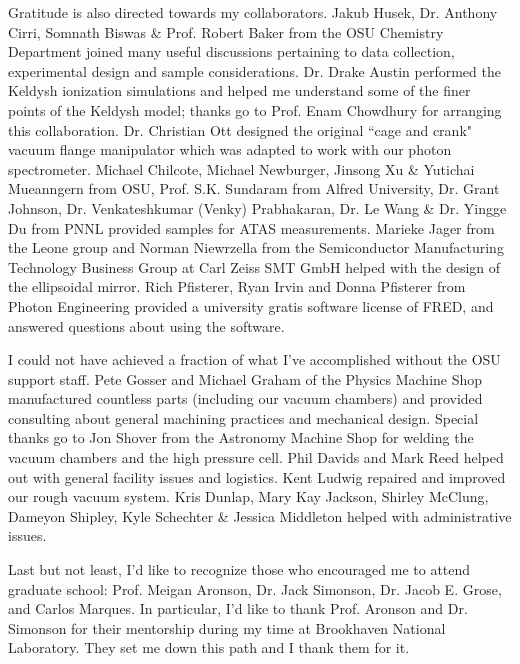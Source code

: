 \begin{acknowledgments}
Gratitude is also directed towards my collaborators. Jakub Husek, Dr. Anthony Cirri, Somnath Biswas \& Prof. Robert Baker from the OSU Chemistry Department joined many useful discussions pertaining to data collection, experimental design and sample considerations. Dr. Drake Austin performed the Keldysh ionization simulations and helped me understand some of the finer points of the Keldysh model; thanks go to Prof. Enam Chowdhury for arranging this collaboration. Dr. Christian Ott designed the original ``cage and crank" vacuum flange manipulator which was adapted to work with our photon spectrometer. Michael Chilcote, Michael Newburger, Jinsong Xu \& Yutichai Mueanngern from OSU, Prof. S.K. Sundaram from Alfred University, Dr. Grant Johnson, Dr. Venkateshkumar (Venky) Prabhakaran, Dr. Le Wang \& Dr. Yingge Du from PNNL provided samples for ATAS measurements. Marieke Jager from the Leone group and Norman Niewrzella from the Semiconductor Manufacturing Technology Business Group at Carl Zeiss SMT GmbH helped with the design of the ellipsoidal mirror. Rich Pfisterer, Ryan Irvin and Donna Pfisterer from Photon Engineering provided a university gratis software license of FRED, and answered questions about using the software.

I could not have achieved a fraction of what I've accomplished without the OSU support staff. Pete Gosser and Michael Graham of the Physics Machine Shop manufactured countless parts (including our vacuum chambers) and provided consulting about general machining practices and mechanical design. Special thanks go to Jon Shover from the Astronomy Machine Shop for welding the vacuum chambers and the high pressure cell. Phil Davids and Mark Reed helped out with general facility issues and logistics. Kent Ludwig repaired and improved our rough vacuum system. Kris Dunlap, Mary Kay Jackson, Shirley McClung, Dameyon Shipley, Kyle Schechter \& Jessica Middleton helped with administrative issues.

Last but not least, I'd like to recognize those who encouraged me to attend graduate school: Prof. Meigan Aronson, Dr. Jack Simonson, Dr. Jacob E. Grose, and Carlos Marques. In particular, I'd like to thank Prof. Aronson and Dr. Simonson for their mentorship during my time at Brookhaven National Laboratory. They set me down this path and I thank them for it.

\end{acknowledgments}